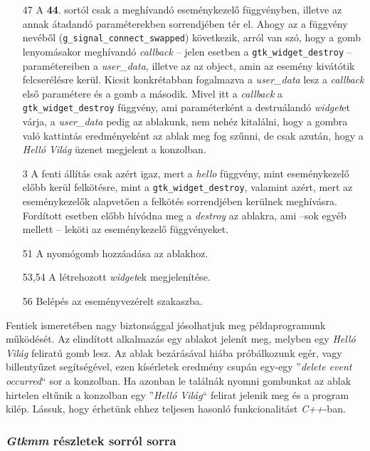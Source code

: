 \begin{enumerate}
 \item[47] A \textbf{44}. sortól csak a meghívandó eseménykezelő függvényben, illetve az annak átadandó paraméterekben sorrendjében tér el. Ahogy az a függvény nevéből (\texttt{g\_signal\_connect\_swapped}) következik, arról van szó, hogy a gomb lenyomásakor meghívandó \textit{callback} -- jelen esetben a \texttt{gtk\_widget\_destroy} -- paramétereiben a \textit{user\_data}, illetve az az object, amin az esemény kivátótik felcserélésre kerül. Kicsit konkrétabban fogalmazva a \textit{user\_data} lesz a \textit{callback} első paramétere és a gomb a második. Mivel itt a \textit{callback} a \texttt{gtk\_widget\_destroy} függvény, ami paraméterként a destruálandó \textit{widget}et várja, a \textit{user\_data} pedig az ablakunk, nem nehéz kitalálni, hogy a gombra való kattintás eredményeként az ablak meg fog szűnni, de csak azután, hogy a \textit{Helló Világ} üzenet megjelent a konzolban.

 \item[3] A fenti állítás csak azért igaz, mert a \textit{hello} függvény, mint eseménykezelő előbb kerül felkötésre, mint a \texttt{gtk\_widget\_destroy}, valamint azért, mert az eseménykezelők alapvetően a felkötés sorrendjében kerülnek meghívásra. Fordított esetben előbb hívódna meg a \textit{destroy} az ablakra, ami --sok egyéb mellett -- leköti az eseménykezelő függvényeket.

 \item[51] A nyomógomb hozzáadása az ablakhoz.

 \item[53,54] A létrehozott \textit{widget}ek megjelenítése.

 \item[56] Belépés az eseményvezérelt szakaszba.

\end{enumerate}

Fentiek ismeretében nagy biztonsággal jósolhatjuk meg példaprogramunk működését. Az elindított alkalmazás egy ablakot jelenít meg, melyben egy \textit{Helló Világ} feliratú gomb lesz. Az ablak bezárásával hiába próbálkozunk egér, vagy billentyűzet segítségével, ezen kísérletek eredmény csupán egy-egy ''\textit{delete event occurred}`` sor a konzolban. Ha azonban le találnák nyomni gombunkat az ablak hirtelen eltűnik a konzolban egy ''\textit{Helló Világ}`` felirat jelenik meg és a program kilép. Lássuk, hogy érhetünk ehhez teljesen hasonló funkcionalitást \textit{C++}-ban.

\subsubsection{\textit{Gtkmm} részletek sorról sorra}

